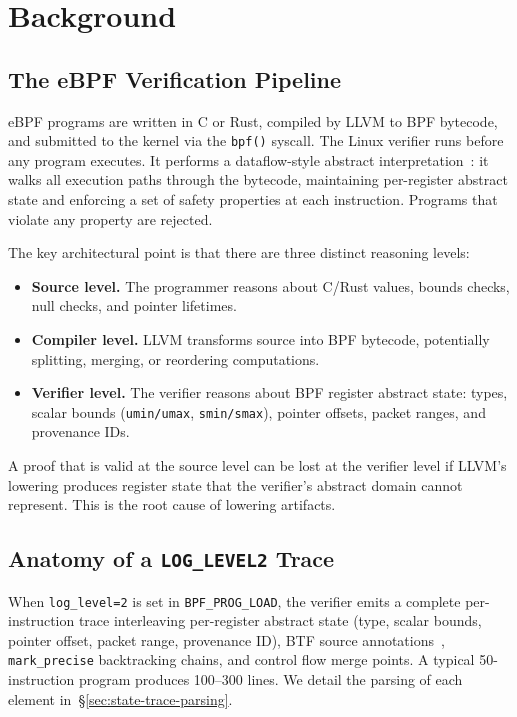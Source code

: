 \documentclass[sigplan,10pt,anonymous,review]{acmart}
\begin{document}
\section{Background}

\subsection{The eBPF Verification Pipeline}

eBPF programs are written in C or Rust, compiled by LLVM to BPF bytecode, and
submitted to the kernel via the \texttt{bpf()} syscall.  The Linux verifier
runs before any program executes.  It performs a dataflow-style abstract
interpretation~\cite{cousot1977,gershuni2019simple}: it walks all execution
paths through the bytecode, maintaining per-register abstract state and
enforcing a set of safety properties at each instruction.  Programs that
violate any property are rejected.

The key architectural point is that there are three distinct reasoning levels:
\begin{itemize}
  \item \textbf{Source level.}  The programmer reasons about C/Rust values,
        bounds checks, null checks, and pointer lifetimes.
  \item \textbf{Compiler level.}  LLVM transforms source into BPF bytecode,
        potentially splitting, merging, or reordering computations.
  \item \textbf{Verifier level.}  The verifier reasons about BPF register
        abstract state: types, scalar bounds (\texttt{umin/umax},
        \texttt{smin/smax}), pointer offsets, packet ranges, and provenance IDs.
\end{itemize}
A proof that is valid at the source level can be lost at the verifier level if
LLVM's lowering produces register state that the verifier's abstract domain
cannot represent.  This is the root cause of lowering artifacts.

\subsection{Anatomy of a \texttt{LOG\_LEVEL2} Trace}
\label{sec:trace-anatomy}

When \texttt{log\_level=2} is set in \texttt{BPF\_PROG\_LOAD}, the verifier
emits a complete per-instruction trace interleaving per-register abstract state
(type, scalar bounds, pointer offset, packet range, provenance ID), BTF source
annotations~\cite{linuxbtf}, \texttt{mark\_precise} backtracking chains, and
control flow merge points.  A typical 50-instruction program produces
100--300 lines.  We detail the parsing of each element in~\S\ref{sec:state-trace-parsing}.
\end{document}
